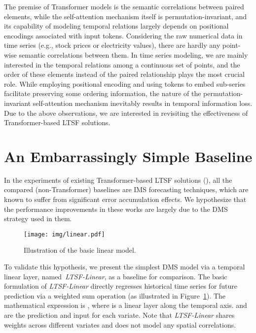 \documentclass[10pt,twocolumn,letterpaper]{article}
\newcommand{\modelname}{\emph{LTSF-Linear}\xspace}
\begin{document}
The premise of Transformer models is the semantic correlations between paired elements, while the self-attention mechanism itself is permutation-invariant, and its capability of modeling temporal relations largely depends on positional encodings associated with input tokens. Considering the raw numerical data in time series (e.g., stock prices or electricity values), there are hardly any point-wise semantic correlations between them. In time series modeling, we are mainly interested in the temporal relations among a continuous set of points, and the order of these elements instead of the paired relationship plays the most crucial role. While employing positional encoding and using tokens to embed sub-series facilitate preserving some ordering information, the nature of the permutation-invariant self-attention mechanism inevitably results in temporal information loss. Due to the above observations, we are interested in revisiting the effectiveness of Transformer-based LTSF solutions. 
 
\section{An Embarrassingly Simple Baseline}
\label{sec:method_simple}

In the experiments of existing Transformer-based LTSF solutions (), all the compared (non-Transformer) baselines are IMS forecasting techniques, which are known to suffer from significant error accumulation effects. We hypothesize that the performance improvements in these works are largely due to the DMS strategy used in them. 

\begin{figure}[h]
\begin{center}
\texttt{[image: img/linear.pdf]}
\end{center}
\vspace{-0.3cm}
\caption{Illustration of the basic linear model.}
\vspace{-0.3cm}
\label{fig:Linear}
\end{figure}


To validate this hypothesis, we present the simplest DMS model via a temporal linear layer, named~\modelname, as a baseline for comparison. The basic formulation of \modelname directly regresses historical time series for future prediction via a weighted sum operation (as illustrated in Figure~\ref{fig:Linear}).
The mathematical expression is 
, where  is a linear layer along the temporal axis.  and  are the prediction and input for each  variate. Note that \modelname shares weights across different variates and does not model any spatial correlations.
\end{document}
